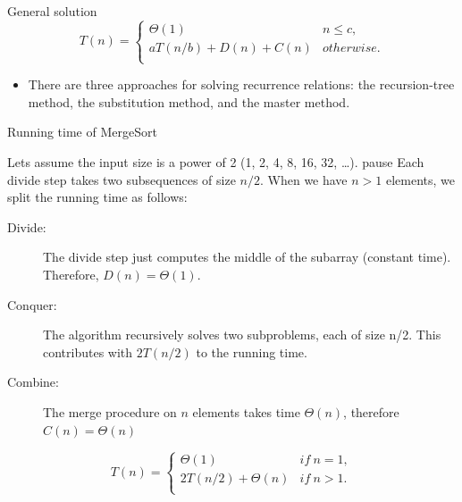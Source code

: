 \begin{frame}

  \begin{block}{General solution}
  \[ 
   T(n)= \left\{
   \begin{array}{ll}
     \Theta(1) & n \leq c, \\
     aT(n/b) + D(n) + C(n) & otherwise. \\
   \end{array} 
   \right. 
   \]
  \end{block}      

  \begin{itemize}
  \item There are three approaches for solving
    recurrence relations: the recursion-tree method,
    the substitution method, and the master method. 
  \end{itemize}
\end{frame}


\begin{frame}{Running time of MergeSort}

  Lets assume the input size is a power of 2 (1, 2, 4, 8, 16, 32, \ldots). pause
  Each divide step takes two subsequences of size $n/2$. \pause When we
  have $n > 1$ elements, we split the running time as follows:

  \begin{description}
   \item [Divide:] The divide step just computes the middle of the subarray (constant time).
     Therefore, $D(n) = \Theta(1)$.
   \item [Conquer:] The algorithm recursively solves two subproblems, each of size n/2.
     This contributes with $2T(n/2)$ to the running time.
     
   \item [Combine:] The merge procedure on $n$ elements takes time $\Theta(n)$, therefore
     $C(n) = \Theta(n)$
  \end{description}
\end{frame}

\begin{frame} 
  \[ 
   T(n)= \left\{
   \begin{array}{ll}
     \Theta(1) & if\ n = 1, \\
     2T(n/2) + \Theta(n) & if\ n > 1. \\
   \end{array} 
   \right. 
   \]
  
\end{frame}



